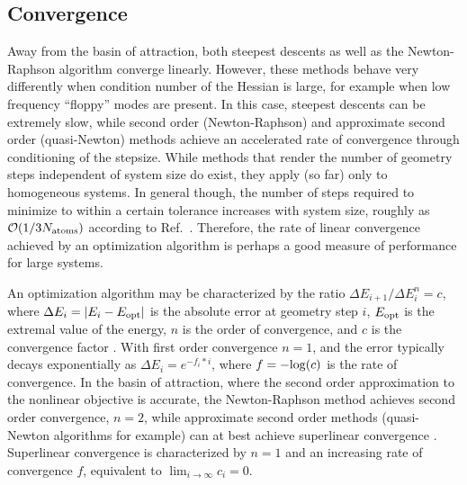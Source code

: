 \documentclass[prl,aps,preprint,showpacs,superbib]{revtex4}
\begin{document}
\subsection{Convergence}

Away from the basin of attraction, both steepest descents as well as the 
Newton-Raphson algorithm converge linearly.   However, these methods behave very differently
when condition number of the Hessian is large, for example when low frequency ``floppy'' modes
are present.  In this case, steepest descents can be extremely slow, while second order 
(Newton-Raphson) and approximate second order (quasi-Newton) methods achieve an accelerated rate 
of convergence through conditioning of the stepsize.   While methods that render  the
number of geometry steps independent of system size do exist\cite{SGoedecker01}, they apply (so far) 
only to homogeneous systems.  In general though, the number of steps required to minimize to within
a certain tolerance increases with system size, roughly as ${\cal O}(1/3 N_{\rm atoms})$ 
according to Ref.~.  Therefore, the rate of linear convergence achieved by an 
optimization algorithm is perhaps a good  measure of performance for large systems.  

An optimization algorithm may be characterized by the ratio $ {\Delta E_{i+1}}/{\Delta E_{i}^n} =c$,
where $\Delta E_i = |E_{i}-E_{\rm opt}| $ is the absolute error at geometry step $i$,
$E_{\rm opt}$ is the extremal value of the energy, $n$ is the order of convergence, 
and $c$ is the convergence factor \cite{Quarteroni}.  With first order convergence $n=1$, and
the error typically decays exponentially as $\Delta E_i = e^{-f_i*i}$, where $f=-{\rm log}(c)$ is the 
rate of convergence. In the basin of attraction, where the second order approximation 
to the nonlinear objective is accurate, the Newton-Raphson method achieves second order convergence,
$ n=2$, while approximate second order methods (quasi-Newton algorithms for example) can 
at best achieve superlinear convergence \cite{RFletcher,Pulay_natural_internals}.   Superlinear 
convergence is characterized by $n=1$ and an increasing rate of convergence $f$, equivalent to 
$\lim_{i \to \infty} c_i = 0$.  
\end{document}
